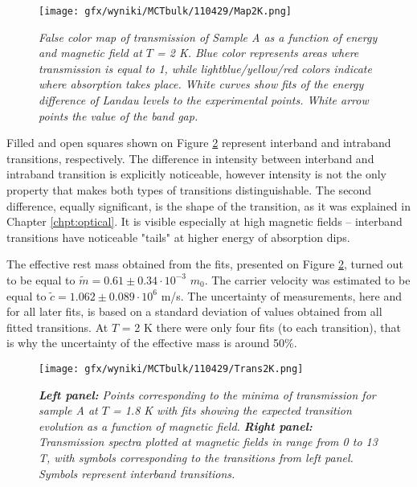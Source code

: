 \documentclass[titlepage,a4paper]{book}
\begin{document}
\begin{figure}[ht]
	\centering
	\texttt{[image: gfx/wyniki/MCTbulk/110429/Map2K.png]}
	\vspace{-10pt}
	\caption{\textit{False color map of transmission of Sample A as a function of energy and magnetic field at $T$ = 2 K. Blue color represents areas where transmission is equal to 1, while lightblue/yellow/red colors indicate where absorption takes place. White curves show fits of the energy difference of Landau levels to the experimental points. White arrow points the value of the band gap.}}
	\label{fig:Map_110429_2K}
\end{figure} 

Filled and open squares shown on Figure \ref{fig:Spectra_110429_2K} represent interband and intraband transitions, respectively. The difference in intensity between interband and intraband transition is explicitly noticeable, however intensity is not the only property that makes both types of transitions distinguishable. The second difference, equally significant, is the shape of the transition, as it was explained in Chapter \ref{chpt:optical}. It is visible especially at high magnetic fields -- interband transitions have noticeable "tails" at higher energy of absorption dips.

The effective rest mass obtained from the fits, presented on Figure \ref{fig:Spectra_110429_2K}, turned out to be equal to $\tilde m = 0.61 \pm 0.34 \cdot 10^{-3}$ $m_0$. The carrier velocity was estimated to be equal to $\tilde{c} = 1.062 \pm 0.089 \cdot 10^6$ m/s. The uncertainty of measurements, here and for all later fits, is based on a standard deviation of values obtained from all fitted transitions. At $T$ = 2 K there were only four fits (to each transition), that is why the uncertainty of the effective mass is around 50\%.

\begin{figure}[H]
	\centering
	\texttt{[image: gfx/wyniki/MCTbulk/110429/Trans2K.png]}
	\vspace{-10pt}
	\caption{\textit{\textbf{Left panel:} Points corresponding to the minima of transmission for sample A at $T$ = 1.8 K with fits showing the expected transition evolution as a function of magnetic field. \textbf{Right panel:} Transmission spectra plotted at magnetic fields in range from 0 to 13 T, with symbols corresponding to the transitions from left panel. Symbols represent interband transitions.}}
	\label{fig:Spectra_110429_2K}
\end{figure} 
\end{document}
